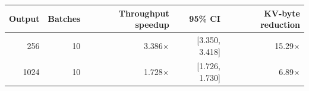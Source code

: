 \begin{tabular}{@{}rrrrr@{}}
\toprule
Output & Batches & Throughput speedup & 95\% CI & KV-byte reduction \\
\midrule
256 & 10 & 3.386$\times$ & [3.350, 3.418] & 15.29$\times$ \\
1024 & 10 & 1.728$\times$ & [1.726, 1.730] & 6.89$\times$ \\
\bottomrule
\end{tabular}
